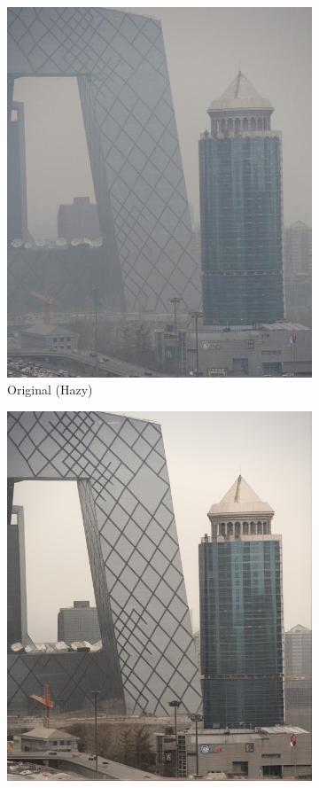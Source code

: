\documentclass{article}
\begin{document}
\begin{figure}[t]
\begin{subfigure}[b]{0.32\textwidth}
    \centering
    \includegraphics[width=\textwidth]{examples_original/2.png}
    \caption{Original (Hazy)}
\end{subfigure}
\hfill
\begin{subfigure}[b]{0.32\textwidth}
    \centering
    \includegraphics[width=\textwidth]{examples_baseline/2.png}

\end{subfigure}
\end{figure}
\end{document}
